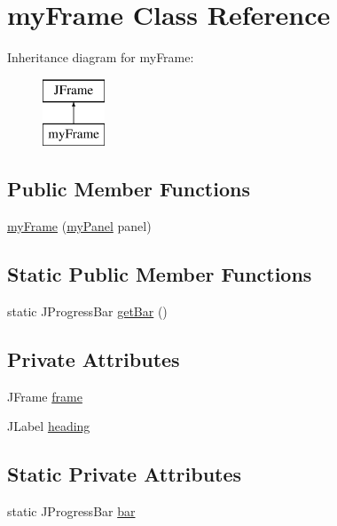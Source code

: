 \hypertarget{classmy_frame}{}\section{my\+Frame Class Reference}
\label{classmy_frame}
Inheritance diagram for my\+Frame\+:\begin{figure}[H]
\begin{center}
\leavevmode
\includegraphics[height=2.000000cm]{classmy_frame}
\end{center}
\end{figure}
\subsection*{Public Member Functions}
\begin{DoxyCompactItemize}
\item 
\hyperlink{classmy_frame_a2b3c0cea5de20595de9c29760f8b69f3}{my\+Frame} (\hyperlink{classmy_panel}{my\+Panel} panel)
\end{DoxyCompactItemize}
\subsection*{Static Public Member Functions}
\begin{DoxyCompactItemize}
\item 
static J\+Progress\+Bar \hyperlink{classmy_frame_ab4821a86dfc373a36ef2d654cf81f238}{get\+Bar} ()
\end{DoxyCompactItemize}
\subsection*{Private Attributes}
\begin{DoxyCompactItemize}
\item 
J\+Frame \hyperlink{classmy_frame_a963c049a55022bde2ded62a4bd17c742}{frame}
\item 
J\+Label \hyperlink{classmy_frame_a06126b852f7b1fa4587cb244e3ec4d2b}{heading}
\end{DoxyCompactItemize}
\subsection*{Static Private Attributes}
\begin{DoxyCompactItemize}
\item 
static J\+Progress\+Bar \hyperlink{classmy_frame_ae283c7ab04567b1827978486e39a7e95}{bar}
\end{DoxyCompactItemize}


